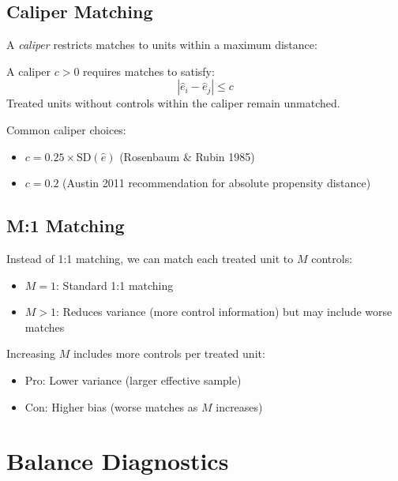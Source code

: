 \subsection{Caliper Matching}

A \emph{caliper} restricts matches to units within a maximum distance:

\begin{definition}
\label{def:caliper}
A caliper $c > 0$ requires matches to satisfy:
\begin{equation}
|\hat{e}_i - \hat{e}_j| \leq c
\label{eq:caliper}
\end{equation}
Treated units without controls within the caliper remain unmatched.
\end{definition}

Common caliper choices:
\begin{itemize}
    \item $c = 0.25 \times \text{SD}(\hat{e})$ (Rosenbaum \& Rubin 1985)
    \item $c = 0.2$ (Austin 2011 recommendation for absolute propensity distance)
\end{itemize}

\subsection{M:1 Matching}

Instead of 1:1 matching, we can match each treated unit to $M$ controls:

\begin{itemize}
    \item $M = 1$: Standard 1:1 matching
    \item $M > 1$: Reduces variance (more control information) but may include worse matches
\end{itemize}

\begin{remark}
Increasing $M$ includes more controls per treated unit:
\begin{itemize}
    \item Pro: Lower variance (larger effective sample)
    \item Con: Higher bias (worse matches as $M$ increases)
\end{itemize}
\end{remark}


\section{Balance Diagnostics}
\label{sec:balance_diagnostics}

